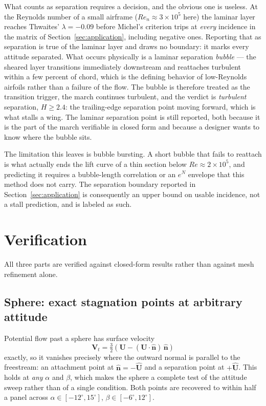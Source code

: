 \documentclass[submit]{aiaa-tc}%
\begin{document}
What counts as separation requires a decision, and the obvious one is
useless. At the Reynolds number of a small airframe ($Re_n \approx 3
\times 10^5$ here) the laminar layer reaches Thwaites' $\lambda = -0.09$
before Michel's criterion trips at \emph{every} incidence in the matrix
of Section~\ref{sec:application}, including negative ones. Reporting that
as separation is true of the laminar layer and draws no boundary: it
marks every attitude separated. What occurs physically is a laminar
separation \emph{bubble} --- the sheared layer transitions immediately
downstream and reattaches turbulent within a few percent of chord, which
is the defining behavior of low-Reynolds airfoils rather than a failure of
the flow. The bubble is therefore treated as the transition trigger, the
march continues turbulent, and the verdict is \emph{turbulent}
separation, $H \geq 2.4$: the trailing-edge separation point moving
forward, which is what stalls a wing. The laminar separation point is
still reported, both because it is the part of the march verifiable in
closed form and because a designer wants to know where the bubble sits.

The limitation this leaves is bubble bursting. A short bubble that fails
to reattach is what actually ends the lift curve of a thin section below
$Re \approx 2\times10^5$, and predicting it requires a bubble-length
correlation or an $e^N$ envelope that this method does not carry. The
separation boundary reported in Section~\ref{sec:application} is
consequently an upper bound on usable incidence, not a stall prediction,
and is labeled as such.

\section{Verification}
\label{sec:verification}

All three parts are verified against closed-form results rather than
against mesh refinement alone.

\subsection{Sphere: exact stagnation points at arbitrary attitude}

Potential flow past a sphere has surface velocity
%
\begin{equation}
  \mathbf{V}_t = \tfrac{3}{2}\left(\mathbf{U}
    - (\mathbf{U}\cdot\hat{\mathbf{n}})\,\hat{\mathbf{n}}\right)
\end{equation}
%
exactly, so it vanishes precisely where the outward normal is parallel to
the freestream: an attachment point at $\hat{\mathbf{n}} =
-\hat{\mathbf{U}}$ and a separation point at $+\hat{\mathbf{U}}$. This
holds at \emph{any} $\alpha$ and $\beta$, which makes the sphere a
complete test of the attitude sweep rather than of a single condition.
Both points are recovered to within half a panel across
$\alpha \in [-12^\circ, 15^\circ]$, $\beta \in [-6^\circ, 12^\circ]$.
\end{document}
